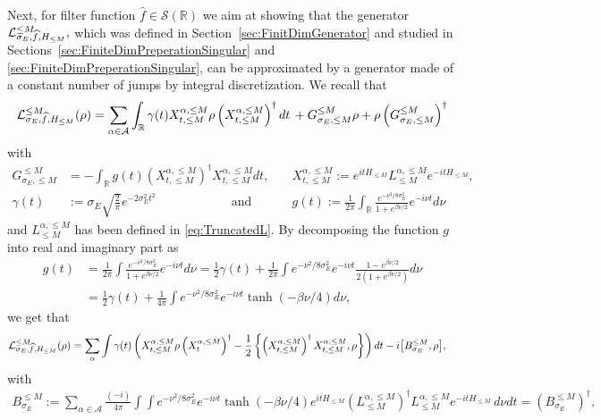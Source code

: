 \documentclass[11pt]{amsart}
\newcommand{\1}{\mathbbm{1}}
\newcommand{\R}{\mathbb{R}}
\newcommand{\cL}{\mathcal{L}}
\newcommand{\cA}{\mathcal{A}}
\theoremstyle{plain}
\theoremstyle{definition}
\theoremstyle{remark}
\numberwithin{equation}{section}
\begin{document}
\noindent Next, for filter function $\widehat f\in\mathcal{S}(\R)$ we aim at showing that the generator $\cL_{\smash{\sigma_E,\widehat{f},H_{\le M}}}^{\le M},$ which was defined in Section~\ref{sec:FinitDimGenerator} and studied in Sections~\ref{sec:FiniteDimPreperationSingular} and \ref{sec:FiniteDimPreperationSingular},  can be approximated by a generator made of a constant number of jumps by integral discretization. We recall that 
\begin{align*}
\cL_{\smash{\sigma_E,\widehat{f},H_{\le M}}}^{\le M}(\rho)=\sum_{\alpha\in\cA} \int_\R \gamma(t) X_{t,\le M}^{\alpha,\le M}\rho \left(X_{t,\le M}^{\alpha,\le M}\right)^\dagger dt\, + G^{\le M}_{\sigma_E,\le M}\rho +\rho \left(G^{\le M}_{\sigma_E,\le M}\right)^\dagger 
\end{align*}
with 
\begin{align*}
G^{\le M}_{\sigma_E,\le M} &=- \int_\R g(t) (X_{t,\le M}^{\alpha,\le M})^\dagger X_{t,\le M}^{\alpha,\le M}dt,\quad &
X_{t,\le M}^{\alpha,\le M}:=e^{itH_{\le M}}L_{\le M}^{\alpha,\le M}e^{-itH_{\le M}},\\\gamma(t)&:=\sigma_E\sqrt{\frac{2}{\pi}}e^{-2\sigma_E^2 t^2}\qquad\qquad\qquad\text{and}&g(t):=\frac{1}{2\pi}\int _\R \frac{e^{-\nu^2/8\sigma_E^2}}{1+e^{\beta\nu/2}}e^{-i\nu t}d\nu
\end{align*}
and $L^{\alpha,\le M}_{\le M}$ has been defined in \eqref{eq:TruncatedL}.
  By decomposing the function $g$ into real and imaginary part as
\begin{align*}
g(t)&=\frac{1}{2\pi}\int \frac{e^{-\nu^2/8\sigma_E^2}}{1+e^{\beta\nu/2}}e^{-i\nu t}d\nu=\frac{1}{2}\gamma(t)+\frac{1}{2\pi}\int {e^{-\nu^2/8\sigma_E^2}}e^{-i\nu t}  \frac{1-e^{\beta\nu/2}}{2(1+e^{\beta\nu/2})} d\nu \\&=\frac{1}{2}\gamma(t)+\frac{1}{4\pi}\int {e^{-\nu^2/8\sigma_E^2}}e^{-i\nu t} \tanh(-\beta \nu/4) d\nu,
\end{align*}
we get that 
\begin{align*}
\cL_{\smash{\sigma_E,\widehat{f},H_{\le M}}}^{\le M}(\rho)&=\sum_\alpha \int \gamma(t)\left( X_{t,\le M}^{\alpha,\le M}\rho \left(X_t^{\alpha,\le M}\right)^\dagger-\frac{1}{2}\left\{\left(X_{t,\le M}^{\alpha,\le M}\right)^\dagger X_{t,\le M}^{\alpha,\le M},\rho\right\}\right) dt-i\big[B^{\le M}_{\sigma_E},\rho\big],
\end{align*}
with
\begin{align*}
B_{\sigma_E}^{\le M}:=\sum_{\alpha\in\mathcal{A}}\frac{(-i)}{4\pi}\int\int {e^{-\nu^2/8\sigma_E^2}}e^{-i\nu t}  \tanh(-\beta\nu/4)  e^{itH_{\le M}}(L_{\le M}^{\alpha,\le M})^\dagger L_{\le M}^{\alpha,\le M} e^{-itH_{\le M}}\,d\nu dt=(B_{\sigma_E}^{\le M})^\dagger,
\end{align*}
\end{document}
